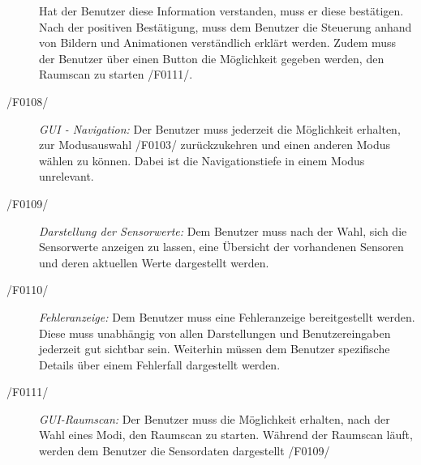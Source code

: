 \begin{description}
  Hat der Benutzer diese Information verstanden, muss er diese bestätigen. 
  Nach der positiven Bestätigung, muss dem Benutzer die Steuerung anhand von Bildern und Animationen verständlich erklärt werden. 
  Zudem muss der Benutzer über einen Button die Möglichkeit gegeben werden, den Raumscan zu starten /F0111/.
  \item[/F0108/]
  \textit{GUI - Navigation:}
  Der Benutzer muss jederzeit die Möglichkeit erhalten, zur Modusauswahl  /F0103/ zurückzukehren und einen anderen Modus wählen zu können. 
  Dabei ist die Navigationstiefe in einem Modus unrelevant.
  \item[/F0109/]
  \textit{Darstellung der Sensorwerte:}
  Dem Benutzer muss nach der Wahl, sich die Sensorwerte anzeigen zu lassen, eine Übersicht der vorhandenen Sensoren und deren aktuellen Werte dargestellt werden.
  \item[/F0110/]
  \textit{Fehleranzeige:}
  Dem Benutzer muss eine Fehleranzeige bereitgestellt werden. Diese muss unabhängig von allen Darstellungen und Benutzereingaben jederzeit gut sichtbar sein. 
  Weiterhin müssen dem Benutzer spezifische Details über einem Fehlerfall dargestellt werden.
  \item[/F0111/]
  \textit{GUI-Raumscan:}
  Der Benutzer muss die Möglichkeit erhalten, nach der Wahl eines Modi, den Raumscan zu starten. 
  Während der Raumscan läuft, werden dem Benutzer die Sensordaten dargestellt /F0109/
\end{description}
